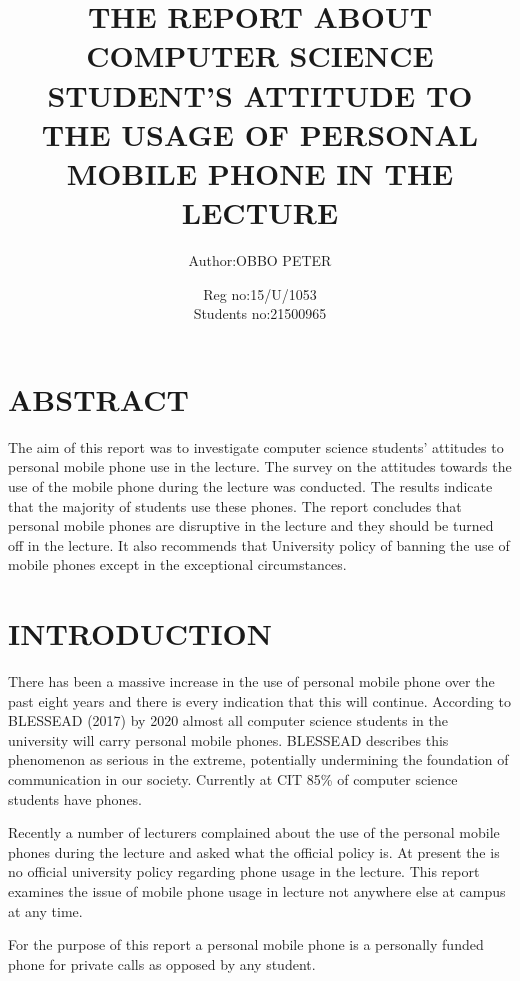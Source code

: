 \documentclass{article}
\begin{document}
	\title{THE REPORT ABOUT COMPUTER SCIENCE STUDENT’S ATTITUDE TO THE USAGE OF PERSONAL MOBILE PHONE IN THE LECTURE}
	\author{Author:OBBO PETER}
	\date{Reg no:15/U/1053 \\  Students no:21500965}
	
	
\maketitle

\tableofcontents

\section{ABSTRACT}\label{sec:into}

The aim of this report was to investigate computer science students’ attitudes to personal mobile phone use in the lecture. The survey on the attitudes towards the use of the mobile phone during the lecture was conducted. The results indicate that the majority of students use these phones. The report concludes that personal mobile phones are disruptive in the lecture and they should be turned off in the lecture. It also recommends that University policy of banning the use of mobile phones except in the exceptional circumstances. 

\section{INTRODUCTION}\label{sec:into}
There has been a massive increase in the use of personal mobile phone over the past eight years and there is every indication that this will continue. According to BLESSEAD (2017) by 2020 almost all computer science students in the university will carry personal mobile phones. BLESSEAD describes this phenomenon as serious in the extreme, potentially undermining the foundation of communication in our society. Currently at CIT 85\% of computer science students have phones.


Recently a number of lecturers complained about the use of the personal mobile phones during the lecture and asked what the official policy is. At present the is no official university policy regarding phone usage in the lecture. This report examines the issue of mobile phone usage in lecture not anywhere else at campus at any time.


For the purpose of this report a personal mobile phone is a personally funded phone for private calls as opposed by any student.
\end{document}
